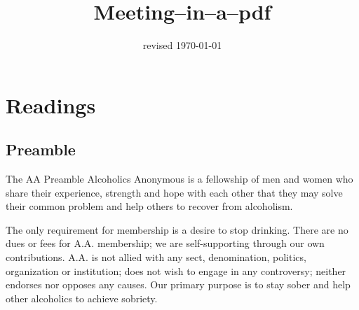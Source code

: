 \documentclass{beamer}
\title{Meeting--in--a--pdf}
\author{}
\institute{Formatted for screen sharing}
\date{revised \today}
\begin{document}
    \begin{frame}
        \maketitle
    \end{frame}
    
    \section{Readings}
  \subsection{Preamble}
       \begin{frame}[plain]\large
       \begin{exampleblock}{The AA Preamble}
Alcoholics Anonymous is a fellowship of men and
women who share their experience, strength and
hope with each other that they may solve their
common problem and help others to recover from
alcoholism.
\bigskip

The only requirement for membership is a desire
to stop drinking. There are no dues or fees for
A.A. membership; we are self-supporting through
our own contributions. A.A. is not allied with any
sect, denomination, politics, organization or
institution; does not wish to engage in any
controversy; neither endorses nor opposes any
causes. Our primary purpose is to stay sober and
help other alcoholics to achieve sobriety.
\end{exampleblock}
    \end{frame}
   
\end{document}
